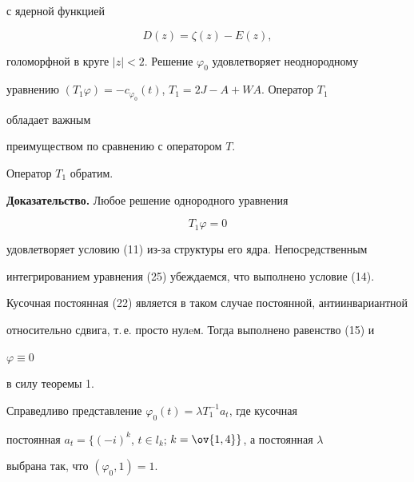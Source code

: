 с ядерной функцией 


\begin{equation} 


D(z)=\zeta(z)-E(z), 


\end{equation} 


голоморфной в круге $|z|<2$. Решение $\varphi_0$ удовлетворяет неоднородному 


уравнению $(T_1\varphi)=-c_{\varphi_0}(t)$, $T_1=2J-A+WA$. Оператор $T_1$ 


обладает важным 


преимуществом по сравнению с оператором $T$. 


 


 


\begin{thm} 


Оператор $T_1$ обратим. 


\end{thm} 


 


 


{\bf Доказательство.} Любое решение однородного уравнения 


\begin{equation} 


T_1\varphi=0 


\end{equation} 


удовлетворяет условию (11) из-за структуры его ядра. Непосредственным 


интегрированием уравнения (25) убеждаемся, что выполнено условие (14). 


Кусочная постоянная (22) является в таком случае постоянной, антиинвариантной 


относительно сдвига, т.\,е. просто нулeм. Тогда выполнено равенство (15) и 


$\varphi\equiv0$ 


в силу теоремы 1. 


 


 


\begin{cor} 


Справедливо представление $\varphi_0(t)=\lambda T^{-1}_1a_t$, где кусочная 


постоянная $a_t=\{(-i)^k$, $t\in l_k$; $k=\ov{1,4}\}$, а постоянная $\lambda$ 


выбрана так, что $(\varphi_0,1)=1$. 


\end{cor} 


